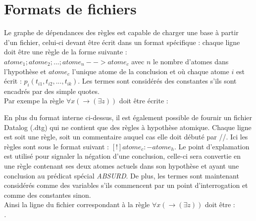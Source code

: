 \section{Formats de fichiers}\label{formats_fichiers}
Le graphe de dépendances des règles est capable de charger une base à partir d'un
fichier, celui-ci devant être écrit dans un format spécifique : chaque ligne doit être
une règle de la forme suivante :
$atome_1;atome_2;...;atome_n-->atome_c$ avec $n$ le nombre d'atomes dans l'hypothèse et
$atome_c$ l'unique atome de la conclusion et
où chaque atome $i$ est écrit : $p_i(t_{i1},t_{i2},...,t_{ik})$.
Les termes sont considérés des constantes s'ils sont encadrés par des simple
quotes.\\%
Par exempe la règle $\forall x ( \rightarrow (\exists z ) )$ doit être écrite : \\
{\em }

En plus du format interne ci-dessus, il est également possible de fournir un fichier
Datalog (.dtg) qui ne contient que des règles à hypothèse atomique. Chaque ligne est soit
une règle, soit un commentaire auquel cas elle doit débuté par //.
Ici les règles sont sous le format suivant :
$[!]atome_c :- atome_h.$
Le point d'explamation est utilisé pour signaler la négation d'une conclusion, celle-ci
sera convertie en une règle contenant ses deux atomes actuels dans son hypothèse et ayant
une conclusion au prédicat spécial {\em ABSURD}.
De plus, les termes sont maintenant considérés comme des variables s'ils commencent par
un point d'interrogation et comme des constantes sinon.\\%
Ainsi la ligne du fichier correspondant à la règle $\forall x ( \rightarrow (\exists z ) )$ 
doit être :\\
{\em .}

